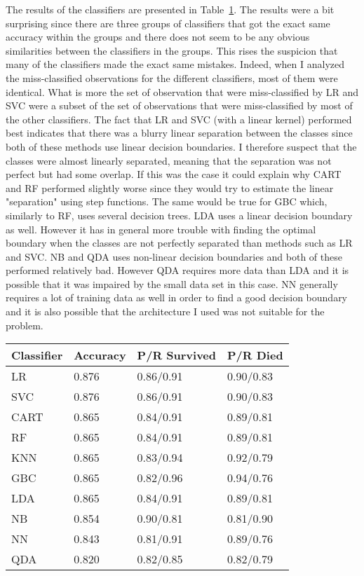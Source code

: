 \documentclass[11pt,twoside,swedish]{article}
\begin{document}
The results of the classifiers
are presented in Table~\ref{titanic classifiers result}. The results
were a bit surprising since there are three groups of classifiers that
got the exact same accuracy within the groups and there does not seem
to be any obvious similarities between the classifiers in the
groups. This rises the suspicion that many of the classifiers made the
exact same mistakes. Indeed, when I analyzed the miss-classified
observations for the different classifiers, most of them were
identical. What is more the set of observation that were
miss-classified by LR and SVC were a subset of the set of observations
that were miss-classified by most of the other classifiers. The fact
that LR and SVC (with a linear kernel) performed best indicates that there was a blurry
linear separation between the classes since both of these methods use
linear decision boundaries. I therefore suspect that the classes were
almost linearly separated, meaning that the separation was not perfect
but had some overlap. If this was the case it could explain why CART
and RF performed slightly worse since they would try to estimate the
linear "separation" using step functions. The same would be true for
GBC which, similarly to RF, uses several decision trees. LDA uses a
linear decision boundary as well. However it has in general more
trouble with finding the optimal boundary when the classes are not
perfectly separated than methods such as LR and SVC. NB and QDA uses
non-linear decision boundaries and both of these performed relatively
bad. However QDA requires more data than LDA and it is possible that
it was impaired by the small data set in this case. NN generally
requires a lot of training data as well in order to find a good
decision boundary and it is also possible that the architecture I used
was not suitable for the problem.

\begin{table}
\begin{center}
\begin{tabular}{ l | l l l }
 Classifier & Accuracy & P/R Survived & P/R Died \\ 
 \hline
 \hline
 LR & 0.876 & 0.86/0.91 & 0.90/0.83\\
SVC & 0.876 & 0.86/0.91 & 0.90/0.83\\
\hline
 CART & 0.865 & 0.84/0.91 & 0.89/0.81\\
RF & 0.865 & 0.84/0.91 & 0.89/0.81\\
KNN & 0.865 & 0.83/0.94 & 0.92/0.79\\
GBC & 0.865 & 0.82/0.96 & 0.94/0.76\\
LDA & 0.865 & 0.84/0.91 & 0.89/0.81\\
\hline
NB & 0.854 & 0.90/0.81 & 0.81/0.90\\
NN & 0.843 & 0.81/0.91 & 0.89/0.76\\
QDA & 0.820 & 0.82/0.85 & 0.82/0.79\\
\end{tabular}
\end{center}
\label{titanic classifiers result}
\end{table}
\end{document}
